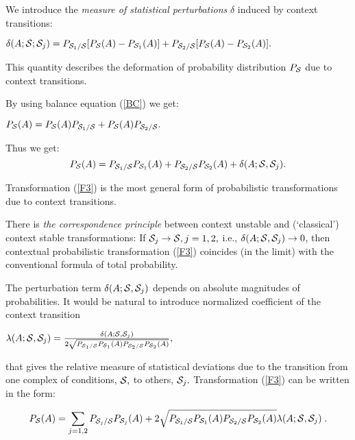 \documentclass[12pt,oneside,final,a4paper]{article}
\begin{document}
We introduce  the {\it measure of statistical perturbations}
$\delta$ induced by context transitions:

$\delta(A;{\cal S}; {\cal S}_j)=P_{{\cal S}_1/{\cal S}} [P_{{\cal S}}(A)-
P_{{\cal S}_1}(A)]+ P_{{\cal S}_2/{\cal S}} [P_{{\cal S}}(A)-
P_{{\cal S}_2}(A)].$

This quantity describes the deformation of probability distribution $P_{{\cal S}}$
due to context transitions.
\medskip

By using balance equation (\ref{BC}) we get:

$P_{{\cal S}}(A)= P_{{\cal S}}(A) P_{{\cal S}_1/{\cal S}}  + P_{{\cal S}}(A)P_{{\cal S}_2/{\cal S}} .$

Thus we get:
\begin{equation}\label{F3}
P_{{\cal S}}(A)= P_{{\cal S}_1/{\cal S}}  P_{{\cal S}_1}(A)+ P_{{\cal S}_2/{\cal S}}  P_{{\cal S}_2}(A)+
\delta(A;{\cal S}, {\cal S}_j).
\end{equation}

Transformation (\ref{F3}) is the most general form of probabilistic transformations due to context transitions. 

There is {\it{the correspondence principle}} between context unstable and (`classical') context
stable transformations: If ${\cal S}_j \rightarrow {\cal S}, j=1,2,$ 
i.e., $\delta(A; {\cal S}, {\cal S}_j) \rightarrow 0$, 
then contextual probabilistic transformation (\ref{F3}) coincides (in the limit) with 
the conventional formula of total probability.

The perturbation term $\delta(A; {\cal S}, {\cal S}_j)$ depends on absolute magnitudes of probabilities. 
It would be natural to introduce normalized coefficient of the context transition 

$\lambda(A; {\cal S}, {\cal S}_j)=
\frac{\delta(A; {\cal S}, {\cal S}_j)}{2\sqrt{P_{{\cal S}_1/{\cal S}}  P_{{\cal S}_1}(A)P_{{\cal S}_2/{\cal S}}  P_{{\cal S}_2}(A)}},$

that gives the relative measure of statistical deviations due to the transition from one complex of conditions, 
${\cal S},$ to others, ${\cal S}_j.$ Transformation (\ref{F3}) can be written in the form:

\begin{equation}
\label{F4}
P_{{\cal S}}(A)= \sum_{j=1,2} P_{{\cal S}_j/{\cal S}}  P_{{\cal S}_j}(A)+
2 \sqrt{P_{{\cal S}_1/{\cal S}}  P_{{\cal S}_1}(A)P_{{\cal S}_2/{\cal S}}  P_{{\cal S}_2}(A)} \lambda(A; {\cal S}, {\cal S}_j)\;.
\end{equation}
\end{document}
